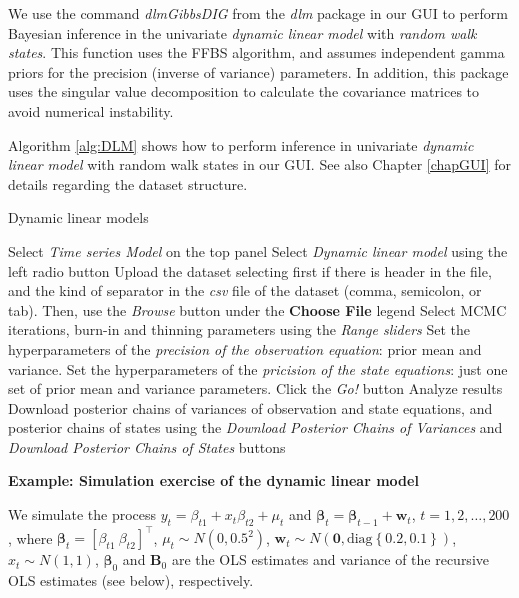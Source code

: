 We use the command \textit{dlmGibbsDIG} from the \textit{dlm} package in our GUI to perform Bayesian inference in the univariate \textit{dynamic linear model} with \textit{random walk states}. This function uses the FFBS algorithm, and assumes independent gamma priors for the precision (inverse of variance) parameters. In addition, this package uses the singular value decomposition to calculate the covariance matrices to avoid numerical instability.

Algorithm \ref{alg:DLM} shows how to perform inference in univariate \textit{dynamic linear model} with random walk states in our GUI. See also Chapter \ref{chapGUI} for details regarding the dataset structure.

\begin{algorithm}[h!]
	\caption{Dynamic linear models}\label{alg:DLM}
	\begin{algorithmic}[1]  		 			
		\State Select \textit{Time series Model} on the top panel
		\State Select \textit{Dynamic linear model} using the left radio button
		\State Upload the dataset selecting first if there is header in the file, and the kind of separator in the \textit{csv} file of the dataset (comma, semicolon, or tab). Then, use the \textit{Browse} button under the \textbf{Choose File} legend
		\State Select MCMC iterations, burn-in and thinning parameters using the \textit{Range sliders}
		\State Set the hyperparameters of the \textit{precision of the observation equation}: prior mean and variance.
		\State Set the hyperparameters of the \textit{pricision of the state equations}: just one set of prior mean and variance parameters.
		\State Click the \textit{Go!} button
		\State Analyze results
		\State Download posterior chains of variances of observation and state equations, and posterior chains of states using the \textit{Download Posterior Chains of Variances} and \textit{Download Posterior Chains of States} buttons
	\end{algorithmic} 
\end{algorithm}

\textbf{Example: Simulation exercise of the dynamic linear model}

We simulate the process $y_t=\beta_{t1}+{x}_t{\beta}_{t2}+\mu_t$ and $\bm{\beta}_t=\bm{\beta}_{t-1}+\bm{w}_t$, $t=1,2,\dots,200$, where $\bm{\beta}_t=[\beta_{t1} \ {\beta}_{t2}]^{\top}$, $\mu_t\sim N(0,0.5^2)$, $\bm{w}_t\sim N(\bm{0},\text{diag}\left\{0.2,0.1\right\})$, $x_t\sim N(1, 1)$, $\bm{\beta}_0$ and $\bm{B}_0$ are the OLS estimates and variance of the recursive OLS estimates (see below), respectively.

